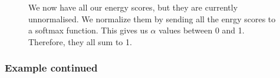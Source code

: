 \documentclass[11pt]{article}
\begin{document}
\begin{figure}[H]
    \centering
    \caption*{We now have all our energy scores, but they are currently unnormalised. We normalize them by sending all the enrgy scores to a softmax function. This gives us $\alpha$ values between 0 and 1. Therefore, they all sum to 1.}
\end{figure}

\subsubsection{Example continued}
\end{document}
